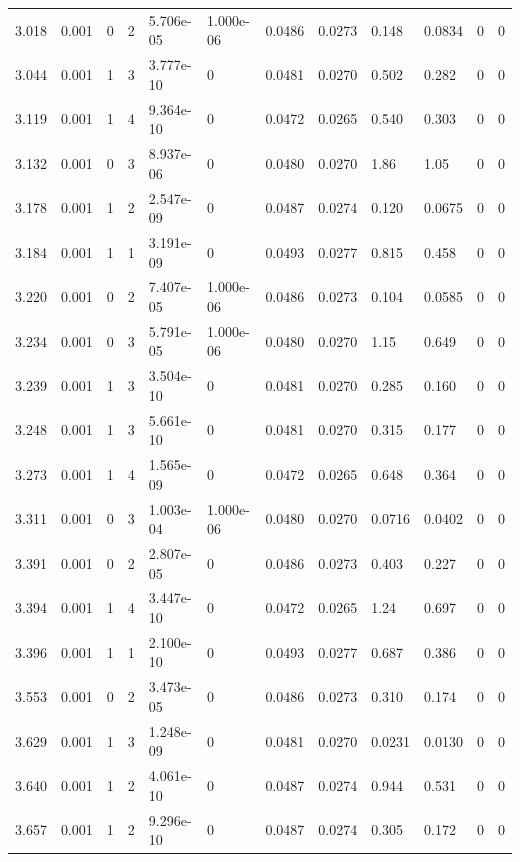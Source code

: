 \documentclass[preview]{standalone}
\begin{document}
{{{\begin{tabular}{L{1.2cm}C{1.2cm} C{0.3cm}C{0.5cm} C{1.4cm}C{1.4cm} C{1.4cm}C{1.4cm} C{1.6cm}C{1.6cm} C{1.6cm}C{1.6cm}}
  3.018  &  0.001  & 0     &  2 &  5.706e-05  & 1.000e-06  &  0.0486&   0.0273& 0.148 & 0.0834   &  0 & 0  \\ 
  3.044  &  0.001  & 1     &  3 &  3.777e-10  & 0  &  0.0481&   0.0270& 0.502 & 0.282   &  0 & 0  \\ 
  3.119  &  0.001  & 1     &  4 &  9.364e-10  & 0  &  0.0472&   0.0265& 0.540 & 0.303   &  0 & 0  \\ 
  3.132  &  0.001  & 0     &  3 &  8.937e-06  & 0  &  0.0480&   0.0270& 1.86 & 1.05   &  0 & 0  \\ 
  3.178  &  0.001  & 1     &  2 &  2.547e-09  & 0  &  0.0487&   0.0274& 0.120 & 0.0675   &  0 & 0  \\ 
  3.184  &  0.001  & 1     &  1 &  3.191e-09  & 0  &  0.0493&   0.0277& 0.815 & 0.458   &  0 & 0  \\ 
  3.220  &  0.001  & 0     &  2 &  7.407e-05  & 1.000e-06  &  0.0486&   0.0273& 0.104 & 0.0585   &  0 & 0  \\ 
  3.234  &  0.001  & 0     &  3 &  5.791e-05  & 1.000e-06  &  0.0480&   0.0270& 1.15 & 0.649   &  0 & 0  \\ 
  3.239  &  0.001  & 1     &  3 &  3.504e-10  & 0  &  0.0481&   0.0270& 0.285 & 0.160   &  0 & 0  \\ 
  3.248  &  0.001  & 1     &  3 &  5.661e-10  & 0  &  0.0481&   0.0270& 0.315 & 0.177   &  0 & 0  \\ 
  3.273  &  0.001  & 1     &  4 &  1.565e-09  & 0  &  0.0472&   0.0265& 0.648 & 0.364   &  0 & 0  \\ 
  3.311  &  0.001  & 0     &  3 &  1.003e-04  & 1.000e-06  &  0.0480&   0.0270& 0.0716 & 0.0402   &  0 & 0  \\ 
  3.391  &  0.001  & 0     &  2 &  2.807e-05  & 0  &  0.0486&   0.0273& 0.403 & 0.227   &  0 & 0  \\ 
  3.394  &  0.001  & 1     &  4 &  3.447e-10  & 0  &  0.0472&   0.0265& 1.24 & 0.697   &  0 & 0  \\ 
  3.396  &  0.001  & 1     &  1 &  2.100e-10  & 0  &  0.0493&   0.0277& 0.687 & 0.386   &  0 & 0  \\ 
  3.553  &  0.001  & 0     &  2 &  3.473e-05  & 0  &  0.0486&   0.0273& 0.310 & 0.174   &  0 & 0  \\ 
  3.629  &  0.001  & 1     &  3 &  1.248e-09  & 0  &  0.0481&   0.0270& 0.0231 & 0.0130   &  0 & 0  \\ 
  3.640  &  0.001  & 1     &  2 &  4.061e-10  & 0  &  0.0487&   0.0274& 0.944 & 0.531   &  0 & 0  \\ 
  3.657  &  0.001  & 1     &  2 &  9.296e-10  & 0  &  0.0487&   0.0274& 0.305 & 0.172   &  0 & 0  \\ 

\end{tabular}}}}
\end{document}
